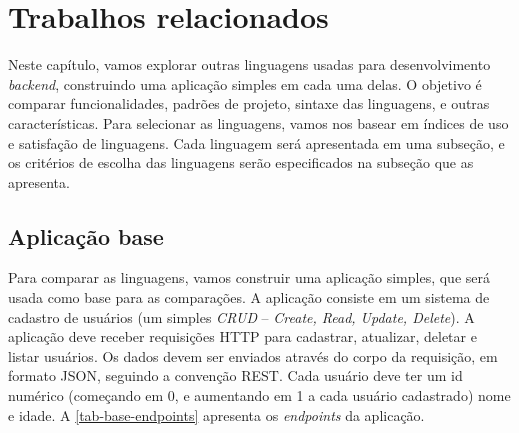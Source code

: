 
\chapter{Trabalhos relacionados}\label{chapter:trabalhos-relacionados}

Neste capítulo, vamos explorar outras linguagens usadas para desenvolvimento \textit{backend},
construindo uma aplicação simples em cada uma delas. O objetivo é comparar funcionalidades,
padrões de projeto, sintaxe das linguagens, e outras características. Para selecionar
as linguagens, vamos nos basear em índices de uso e satisfação de linguagens. Cada
linguagem será apresentada em uma subseção, e os critérios de escolha das linguagens
serão especificados na subseção que as apresenta.

\section{Aplicação base}\label{sec:aplicacao-base}

Para comparar as linguagens, vamos construir uma aplicação simples, que será usada
como base para as comparações. A aplicação consiste em um sistema de cadastro de
usuários (um simples \textit{CRUD} -- \textit{Create, Read, Update, Delete}). A
aplicação deve receber requisições HTTP para cadastrar, atualizar, deletar e listar
usuários. Os dados devem ser enviados através do corpo da requisição, em formato
JSON, seguindo a convenção REST. Cada usuário deve ter um id numérico (começando
em 0, e aumentando em 1 a cada usuário cadastrado) nome e idade. A
\autoref{tab-base-endpoints} apresenta os \textit{endpoints} da aplicação.



